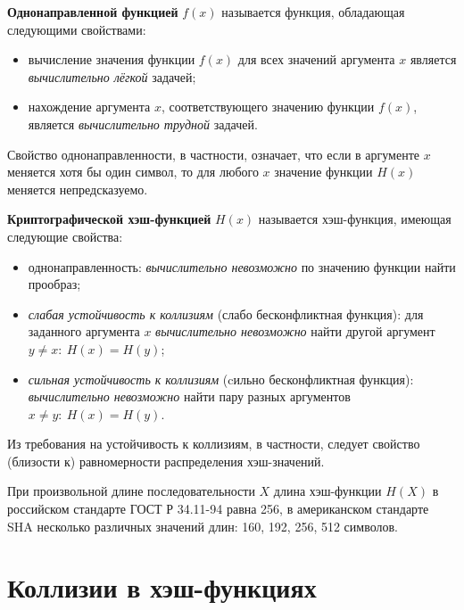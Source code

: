 \textbf{Однонаправленной функцией} $f(x)$ называется функция, обладающая следующими свойствами:
\begin{itemize}
    \item вычисление значения функции $f(x)$ для всех значений аргумента $x$ является \emph{вычислительно лёгкой} задачей;
    \item нахождение аргумента $x$, соответствующего значению функции $f(x)$, является \emph{вычислительно трудной} задачей.
\end{itemize}

Свойство однонаправленности, в частности, означает, что если в аргументе $x$ меняется хотя бы один символ, то для любого $x$ значение функции $H(x)$ меняется непредсказуемо.

\textbf{Криптографической хэш-функцией} $H(x)$ называется хэш-функция, имеющая следующие свойства:
\begin{itemize}
    \item однонаправленность: \emph{вычислительно невозможно} по значению функции найти прообраз;
    \item \emph{слабая устойчивость к коллизиям} (слабо бесконфликтная функция): для заданного аргумента $x$ \emph{вычислительно невозможно} найти другой аргумент $y \neq x: ~ H(x) = H(y)$;
    \item \emph{сильная устойчивость к коллизиям} (cильно бесконфликтная функция): \emph{вычислительно невозможно} найти пару разных аргументов $x \neq y: ~ H(x) = H(y)$.
\end{itemize}

Из требования на устойчивость к коллизиям, в частности, следует свойство (близости к) равномерности распределения хэш-значений.

При произвольной длине последовательности $X$ длина хэш-функции $H(X)$ в российском стандарте ГОСТ Р 34.11-94 равна 256, в американском стандарте SHA несколько различных значений длин: 160, 192, 256, 512 символов.





\section{Коллизии в хэш-функциях}




